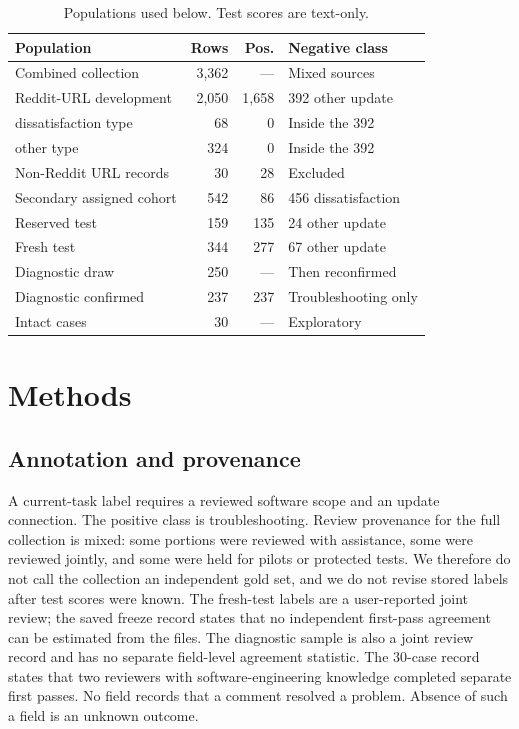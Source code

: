 \documentclass[conference,letterpaper]{IEEEtran}
\begin{document}
\begin{table}[t]
\caption{Populations used below. Test scores are text-only.}
\label{tab:pop}
\centering
\footnotesize
\setlength{\tabcolsep}{3pt}
\begin{tabular}{lrrl}
\toprule
Population & Rows & Pos. & Negative class \\
\midrule
Combined collection & 3,362 & --- & Mixed sources \\
Reddit-URL development & 2,050 & 1,658 & 392 other update \\
\quad dissatisfaction type & 68 & 0 & Inside the 392 \\
\quad other type & 324 & 0 & Inside the 392 \\
Non-Reddit URL records & 30 & 28 & Excluded \\
Secondary assigned cohort & 542 & 86 & 456 dissatisfaction \\
Reserved test & 159 & 135 & 24 other update \\
Fresh test & 344 & 277 & 67 other update \\
Diagnostic draw & 250 & --- & Then reconfirmed \\
Diagnostic confirmed & 237 & 237 & Troubleshooting only \\
Intact cases & 30 & --- & Exploratory \\
\bottomrule
\end{tabular}
\end{table}

\section{Methods}
\subsection{Annotation and provenance}
A current-task label requires a reviewed software scope and an update connection. The positive class is troubleshooting. Review provenance for the full collection is mixed: some portions were reviewed with assistance, some were reviewed jointly, and some were held for pilots or protected tests. We therefore do not call the collection an independent gold set, and we do not revise stored labels after test scores were known. The fresh-test labels are a user-reported joint review; the saved freeze record states that no independent first-pass agreement can be estimated from the files. The diagnostic sample is also a joint review record and has no separate field-level agreement statistic. The 30-case record states that two reviewers with software-engineering knowledge completed separate first passes. No field records that a comment resolved a problem. Absence of such a field is an unknown outcome.
\end{document}
